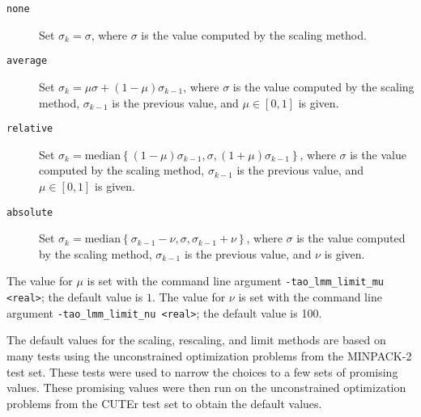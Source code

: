 \begin{description}
\item[{\tt none}] Set $\sigma_k = \sigma$, where $\sigma$ is the value
computed by the scaling method.
\item[{\tt average}] Set $\sigma_k = \mu \sigma + (1 - \mu) \sigma_{k-1}$, 
where $\sigma$ is the value computed by the scaling method, $\sigma_{k-1}$ is
the previous value, and $\mu \in [0,1]$ is given.
\item[{\tt relative}] Set $\sigma_k = \mbox{median}\left\{ (1 - \mu) \sigma_{k-1}, \sigma, (1+\mu) \sigma_{k-1}\right\}$, 
where $\sigma$ is the value computed by the scaling method, $\sigma_{k-1}$ is 
the previous value, and $\mu \in [0,1]$ is given.
\item[{\tt absolute}] Set $\sigma_k = \mbox{median}\left\{\sigma_{k-1} - \nu, \sigma, \sigma_{k-1} + \nu\right\}$, 
where $\sigma$ is the value computed by the scaling method, $\sigma_{k-1}$ is 
the previous value, and $\nu$ is given.
\end{description}
The value for $\mu$ is set with the command line argument 
{\tt -tao\_lmm\_limit\_mu <real>}; the default value is $1$.
The value for $\nu$ is set with the command line argument 
{\tt -tao\_lmm\_limit\_nu <real>}; the default value is 100.  

The default values for the scaling, rescaling, and limit methods are based 
on many tests using the unconstrained optimization problems from the 
MINPACK-2 test set.  These tests were used to narrow the choices to 
a few sets of promising values.  These promising values were then 
run on the unconstrained optimization problems from the CUTEr 
test set to obtain the default values.

